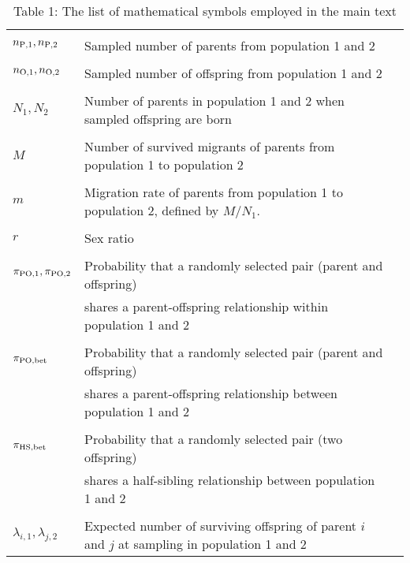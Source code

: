 \documentclass[12pt, English]{article}
\begin{document}
\begin{spacing}{1.9}
\renewcommand{\arraystretch}{0.6}
\begin{table}[tb]
   \caption[]{Table 1: The list of mathematical symbols employed in the main text}
    \textbf {}\\[-4mm]
    \begin{tabular}{llc} \hline
       & & \\
	$n_{\rm P,1}, n_{\rm P, 2}$			& Sampled number of parents from population 1 and 2\\ 
		                						& \\
	$n_{\rm O, 1}, n_{\rm O, 2}$			& Sampled number of offspring from population 1 and 2\\ 
		                						& \\
	$N_{1}, N_{2}$						& Number of parents in population 1 and 2 when sampled offspring are born\\
		                						& \\
	$M$								& Number of survived migrants of parents from population 1 to population 2\\
		                						& \\
	$m$								& Migration rate of parents from population 1 to population 2, defined by $M/N_1$.\\
		                						& \\
	$r$								& Sex ratio\\
		                						& \\
	$\pi_{\rm PO,1}, \pi_{\rm PO,2}$		& Probability that a randomly selected pair (parent and offspring) \\
	                							& shares a parent-offspring relationship within population 1 and 2\\
									& \\
	$\pi_{\rm PO, bet}$					& Probability that a randomly selected pair (parent and offspring) \\
	                							& shares a parent-offspring relationship between population 1 and 2\\
									& \\
	$\pi_{\rm HS, bet}$					& Probability that a randomly selected pair (two offspring) \\
	                							& shares a half-sibling relationship between population 1 and 2\\
					                			& \\
	$\lambda_{i,1}, \lambda_{j,2}$			& Expected number of surviving offspring of parent $i$ and $j$ at sampling in population 1 and 2\\

\end{tabular}
\end{table}
\end{spacing}
\end{document}
